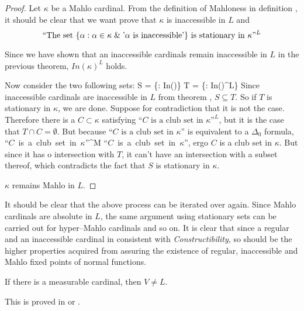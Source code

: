 \begin{proof}
Let $\kappa$ be a Mahlo cardinal. From the definition of Mahloness in definition , it should be clear that we want prove that $\kappa$ is inaccessible in $L$ and 
\begin{equation}
\mbox{``The set }\{\alpha : \alpha \in \kappa \mathrel{\&} \mbox{'$\alpha$ is inaccessible'}\}\mbox{ is stationary in $\kappa$''}^L
\end{equation}

Since we have shown that an inaccessible cardinals remain inaccessible in $L$ in the previous theorem, $In(\kappa)^L$ holds.

Now consider the two following sets:
\beq
S = \{\alpha \in \kappa : In(\alpha)\}\label{eq:mahloness_l_eq_1}
\eeq
\beq
T = \{\alpha \in \kappa : In(\alpha)^L\}\label{eq:mahloness_l_eq_2}
\eeq
Since inaccessible cardinals are inaccessible in $L$ from theorem , $S \subseteq T$.
So if $T$ is stationary in $\kappa$, we are done. Suppose for contradiction that it is not the case. 
Therefore there is a $C \subset \kappa$ satisfying $\mbox{``$C$ is a club set in $\kappa$''}^L$, but it is the case that $T \cap C = \emptyset$.
But because $\mbox{``$C$ is a club set in $\kappa$''}$ is equivalent to a $\Delta_0$ formula, 
\beq
\mbox{``$C$ is a club set in $\kappa$''}^M \iff \mbox{``$C$ is a club set in $\kappa$'',}
\eeq
ergo $C$ is a club set in $\kappa$. But since it has o intersection with $T$, it can't have an intersection with a subset thereof, which contradicts the fact that $S$ is stationary in $\kappa$.

$\kappa$ remains Mahlo in $L$.
\end{proof}

It should be clear that the above process can be iterated over again. Since Mahlo cardinals are absolute in $L$, the same argument using stationary sets can be carried out for hyper–Mahlo cardinals and so on. It is clear that since a regular and an inaccessible cardinal in consistent with \emph{Constructibility}, so should be the higher properties acquired from assuring the existence of regular, inaccessible and Mahlo fixed points of normal functions.


\begin{theorem}
If there is a measurable cardinal, then $V \neq L$.
\end{theorem}
This is proved in \cite{scott_measurable_constructible} or \cite{KanamoriBook}.

